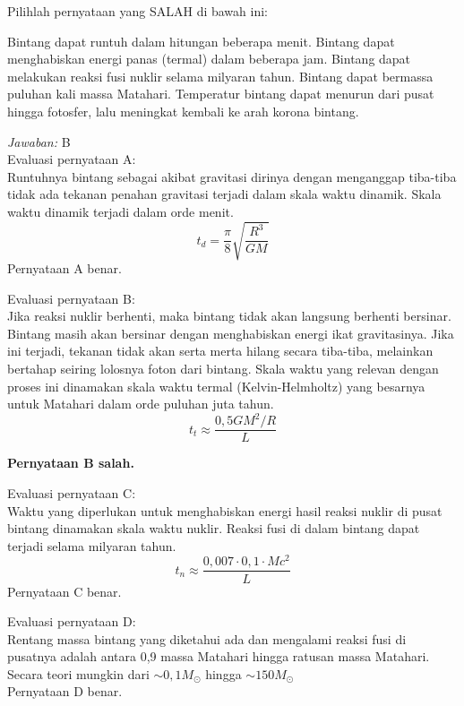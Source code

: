 \documentclass[11pt,fleqn]{exam}
\begin{document}
\begin{questions}
\question Pilihlah pernyataan yang SALAH di bawah ini:
\begin{choices}
\choice Bintang dapat runtuh dalam hitungan beberapa menit.
\choice Bintang dapat menghabiskan energi panas (termal) dalam beberapa jam.
\choice Bintang dapat melakukan reaksi fusi nuklir selama milyaran tahun.
\choice Bintang dapat bermassa puluhan kali massa Matahari.
\choice Temperatur bintang dapat menurun dari pusat hingga fotosfer, lalu meningkat kembali ke arah korona bintang.
\end{choices}

\textit{Jawaban: }B\\
Evaluasi pernyataan A:\\
Runtuhnya bintang sebagai akibat gravitasi dirinya dengan menganggap tiba-tiba tidak ada tekanan penahan gravitasi terjadi dalam skala waktu dinamik. Skala waktu dinamik terjadi dalam orde menit.
\begin{equation*}
t_d = \frac{\pi}{8} \sqrt{\frac{R^3}{GM}}
\end{equation*}
Pernyataan A benar.

Evaluasi pernyataan B:\\
Jika reaksi nuklir berhenti, maka bintang tidak akan langsung berhenti bersinar. Bintang masih akan bersinar dengan menghabiskan energi ikat gravitasinya. Jika ini terjadi, tekanan tidak akan serta merta hilang secara tiba-tiba, melainkan bertahap seiring lolosnya foton dari bintang. Skala waktu yang relevan dengan proses ini dinamakan skala waktu termal (Kelvin-Helmholtz) yang besarnya untuk Matahari dalam orde puluhan juta tahun.
\begin{equation*}
t_t \approx \frac{0,5 G M^2 / R}{L}
\end{equation*}

\textbf{Pernyataan B salah.}

Evaluasi pernyataan C:\\
Waktu yang diperlukan untuk menghabiskan energi hasil reaksi nuklir di pusat bintang dinamakan skala waktu nuklir. Reaksi fusi di dalam bintang dapat terjadi selama milyaran tahun.
\begin{equation*}
t_n \approx \frac{0,007 \cdot 0,1 \cdot M c^2}{L}
\end{equation*}
Pernyataan C benar.

Evaluasi pernyataan D:\\
Rentang massa bintang yang diketahui ada dan mengalami reaksi fusi di pusatnya adalah antara 0,9 massa Matahari hingga ratusan massa Matahari. Secara teori mungkin dari $\sim 0,1M_{\odot}$ hingga $\sim 150 M_{\odot}$ \\
Pernyataan D benar.


\end{questions}
\end{document}
